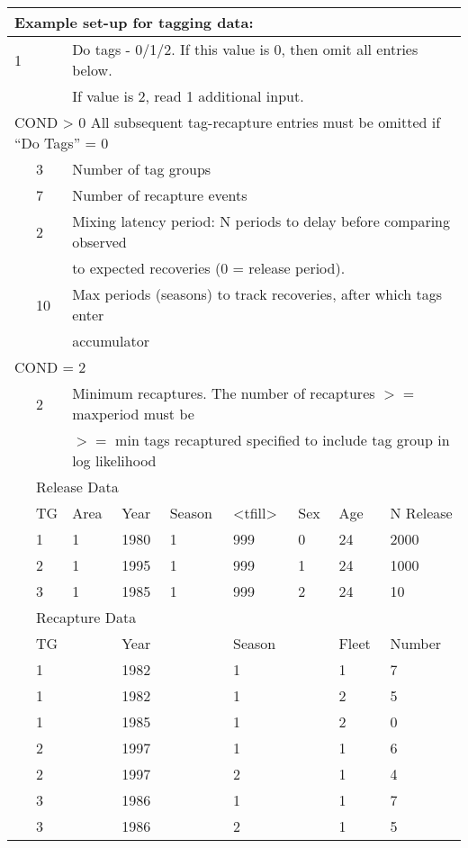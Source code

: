 \pagebreak
\begin{center}
	\begin{longtable}{p{1.1cm} p{1.1cm} p{1.1cm} p{1.1cm} p{1.1cm} p{1.1cm} p{1.1cm} p{1.1cm} p{3cm}}
		\multicolumn{9}{l}{Example set-up for tagging data:} \\
		\hline
		1 & & \multicolumn{7}{l}{Do tags - 0/1/2. If this value is 0, then omit all entries below.} \\
		&   & \multicolumn{7}{l}{If value is 2, read 1 additional input.} \Tstrut\Bstrut\\
		\hline
		\multicolumn{9}{l}{COND > 0 All subsequent tag-recapture entries must be omitted if ``Do Tags'' = 0}
		 \Tstrut\\

		 & 3 & \multicolumn{7}{l}{Number of tag groups} \Bstrut\\
		 \hline
		 & 7 & \multicolumn{7}{l}{Number of recapture events} \Tstrut\Bstrut\\
		 \hline
		 & 2 & \multicolumn{7}{l}{Mixing latency period: N periods to delay before comparing observed} \Tstrut\\
		 &   &  \multicolumn{7}{l}{to expected recoveries (0 = release period).} \Bstrut\\
		 \hline
		 & 10 & \multicolumn{7}{l}{Max periods (seasons) to track recoveries, after which tags enter} \Tstrut\\
		 &    & \multicolumn{7}{l}{accumulator} \Bstrut\\
		 \hline
		 \multicolumn{9}{l}{COND = 2} \Tstrut\\
		 &  2 &  \multicolumn{7}{l}{Minimum recaptures. The number of recaptures $>=$ maxperiod must be} \\
		 &    &  \multicolumn{7}{l}{$>=$ min tags recaptured specified to include tag group in log likelihood}\Bstrut\\
		 
		 \hline
		 & \multicolumn{8}{l}{Release Data} \Tstrut\\ 
		 & TG & Area & Year & Season & <tfill> & Sex & Age & N Release \Bstrut\\ 
		 \hline
		 & 1 & 1 & 1980 & 1 & 999 & 0 & 24 & 2000 \Tstrut\\
		 & 2 & 1 & 1995 & 1 & 999 & 1 & 24 & 1000 \\
		 & 3 & 1 & 1985 & 1 & 999 & 2 & 24 & 10 \Bstrut\\
		 \hline
		 & \multicolumn{8}{l}{Recapture Data} \Tstrut\\
		 & TG &  & Year &  & Season &  & Fleet & Number \Bstrut\\ 
		 \hline
		 & 1 & & 1982 & & 1 & & 1 & 7 \Tstrut\\
		 & 1 & & 1982 & & 1 & & 2 & 5 \\
		 & 1 & & 1985 & & 1 & & 2 & 0 \\
		 & 2 & & 1997 & & 1 & & 1 & 6 \\
		 & 2 & & 1997 & & 2 & & 1 & 4 \\
		 & 3 & & 1986 & & 1 & & 1 & 7 \\
		 & 3 & & 1986 & & 2 & & 1 & 5 \Bstrut\\
		 \hline
	\end{longtable}
\end{center}


